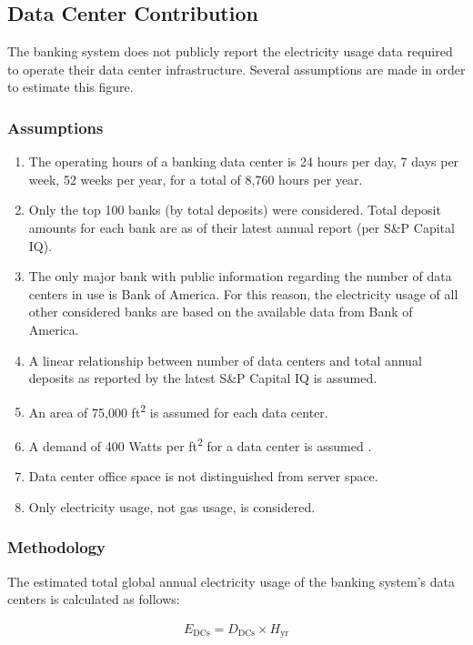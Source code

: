 \subsection{Data Center Contribution}\label{section:banks-data centers}

The banking system does not publicly report the electricity usage data required to operate their data center infrastructure.
Several assumptions are made in order to estimate this figure. 

\subsubsection{Assumptions}
\begin{enumerate}
  \item The operating hours of a banking data center is 24 hours per day, 7 days per week, 52 weeks per year, for a total of 8,760 hours per year.
  \item Only the top 100 banks (by total deposits) were considered. Total deposit amounts for each bank are as of their latest annual report (per S\&P Capital IQ).
  \item The only major bank with public information regarding the number of data centers in use is Bank of America.
    For this reason, the electricity usage of all other considered banks are based on the available data from Bank of America.
  \item A linear relationship between number of data centers and total annual deposits as reported by the latest S\&P Capital IQ is assumed.
  \item An area of 75,000 ft\textsuperscript{2} is assumed for each data center.
  \item A demand of 400 Watts per ft\textsuperscript{2} for a data center is assumed \cite{dc-w-per-ft2}.
  \item Data center office space is not distinguished from server space.
  \item Only electricity usage, not gas usage, is considered.
\end{enumerate}

\subsubsection{Methodology}
The estimated total global annual electricity usage of the banking system's data centers is calculated as follows:

\begin{align}\label{eqn:banks-e-dc}
  E_\textrm{DCs} = D_\textrm{DCs} \times H_\textrm{yr}
\end{align}

